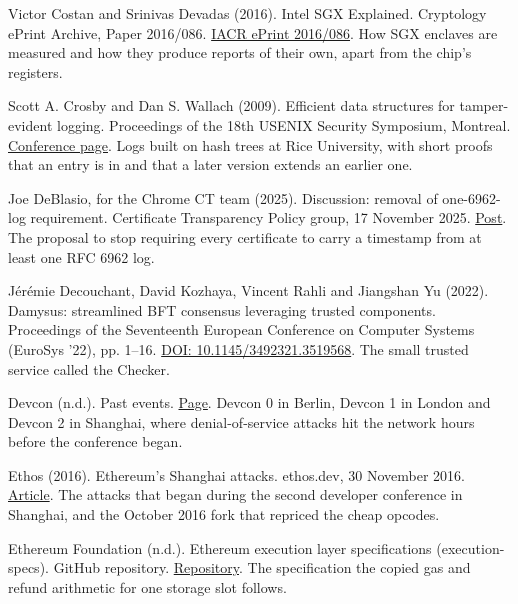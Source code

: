\noindent Victor Costan and Srinivas Devadas (2016). Intel SGX Explained. Cryptology ePrint Archive, Paper 2016/086. \href{https://eprint.iacr.org/2016/086}{IACR ePrint 2016/086}. How SGX enclaves are measured and how they produce reports of their own, apart from the chip's registers.
\par\medskip

\noindent Scott A. Crosby and Dan S. Wallach (2009). Efficient data structures for tamper-evident logging. Proceedings of the 18th USENIX Security Symposium, Montreal. \href{https://www.usenix.org/conference/usenixsecurity09/technical-sessions/presentation/efficient-data-structures-tamper-evident}{Conference page}. Logs built on hash trees at Rice University, with short proofs that an entry is in and that a later version extends an earlier one.
\par\medskip

\noindent Joe DeBlasio, for the Chrome CT team (2025). Discussion: removal of one-6962-log requirement. Certificate Transparency Policy group, 17 November 2025. \href{https://groups.google.com/a/chromium.org/g/ct-policy/c/amrnTiDFdwM/m/mCyPDc4TAwAJ}{Post}. The proposal to stop requiring every certificate to carry a timestamp from at least one RFC 6962 log.
\par\medskip

\noindent J\'er\'emie Decouchant, David Kozhaya, Vincent Rahli and Jiangshan Yu (2022). Damysus: streamlined BFT consensus leveraging trusted components. Proceedings of the Seventeenth European Conference on Computer Systems (EuroSys '22), pp. 1--16. \href{https://doi.org/10.1145/3492321.3519568}{DOI: 10.1145/3492321.3519568}. The small trusted service called the Checker.
\par\medskip

\noindent Devcon (n.d.). Past events. \href{https://devcon.org/en/past-events/}{Page}. Devcon 0 in Berlin, Devcon 1 in London and Devcon 2 in Shanghai, where denial-of-service attacks hit the network hours before the conference began.
\par\medskip

\noindent Ethos (2016). Ethereum's Shanghai attacks. ethos.dev, 30 November 2016. \href{https://ethos.dev/shanghai-attacks}{Article}. The attacks that began during the second developer conference in Shanghai, and the October 2016 fork that repriced the cheap opcodes.
\par\medskip

\noindent Ethereum Foundation (n.d.). Ethereum execution layer specifications (execution-specs). GitHub repository. \href{https://github.com/ethereum/execution-specs}{Repository}. The specification the copied gas and refund arithmetic for one storage slot follows.
\par\medskip

